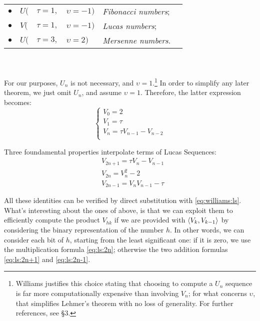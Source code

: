 \begin{tabular}{c l@{\hskip 0pt} l@{\hskip 1pt} l l l}
  $\bullet$ & $U($ & $\tau=1,$ & $\upsilon=-1)$ & \emph{Fibonacci numbers}; \\
  $\bullet$ & $V($ & $\tau=1,$ & $\upsilon=-1)$ & \emph{Lucas numbers}; \\
  $\bullet$ & $U($ & $\tau=3,$ & $\upsilon=2)$ & \emph{Mersenne numbers}.\\
\end{tabular}
\\
\\
For our purposes, $U_n$ is not necessary, and $\upsilon=1$.\footnote{
  Williams justifies this choice stating that choosing to compute a $U_n$ sequence
  is far more computationally expensive than involving $V_n$; for what
  concerns $\upsilon$, that simplifies Lehmer's theorem with no loss of
  generality. For further references,
  see \cite{Williams:p+1} \S 3.}
In order to simplify any later theorem, we just omit $U_n$, and assume $\upsilon
= 1$.
Therefore, the latter expression becomes:
\begin{equation}
  \label{eq:williams:ls}
  \begin{cases}
    V_0 = 2 \\
    V_1 = \tau \\
    V_n = \tau V_{n-1} - V_{n-2} \\
  \end{cases}
\end{equation}

Three foundamental properties interpolate terms of Lucas Sequences:
\begin{align}
  & V_{2n+1} = \tau V_n - V_{n-1} \label{eq:ls:2n+1}\\
  & V_{2n} = V_n^2 - 2 \label{eq:ls:2n}\\
  & V_{2n-1} = V_nV_{n-1} - \tau \label{eq:ls:2n-1}
\end{align}

All these identities can be verified by direct substitution with
\ref{eq:williams:ls}. What's interesting about the ones of above, is that we can
exploit them to efficiently compute the product $V_{hk}$ if we are provided with
$\langle V_k, V_{k-1}\rangle$ by considering the binary representation of the number
$h$. In other words, we can consider each bit of $h$, starting from the least
significant one: if it is zero, we use the multiplication formula
\ref{eq:ls:2n}; otherwise the two addition formulas \ref{eq:ls:2n+1} and
\ref{eq:ls:2n-1}.

